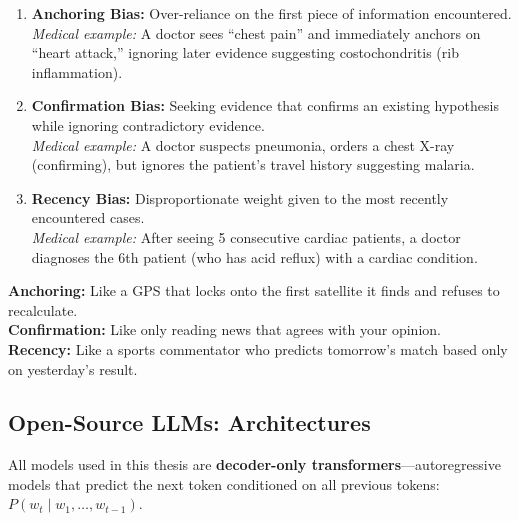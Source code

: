 \begin{enumerate}[label=\textbf{\arabic*.}]
    \item \textbf{Anchoring Bias:} Over-reliance on the first piece of information encountered.\\
    \textit{Medical example:} A doctor sees ``chest pain'' and immediately anchors on ``heart attack,'' ignoring later evidence suggesting costochondritis (rib inflammation).
    
    \item \textbf{Confirmation Bias:} Seeking evidence that confirms an existing hypothesis while ignoring contradictory evidence.\\
    \textit{Medical example:} A doctor suspects pneumonia, orders a chest X-ray (confirming), but ignores the patient's travel history suggesting malaria.
    
    \item \textbf{Recency Bias:} Disproportionate weight given to the most recently encountered cases.\\
    \textit{Medical example:} After seeing 5 consecutive cardiac patients, a doctor diagnoses the 6th patient (who has acid reflux) with a cardiac condition.
\end{enumerate}

\begin{analogybox}[\textcolor{white}{Simple Analogy}]
\textbf{Anchoring:} Like a GPS that locks onto the first satellite it finds and refuses to recalculate.\\
\textbf{Confirmation:} Like only reading news that agrees with your opinion.\\
\textbf{Recency:} Like a sports commentator who predicts tomorrow's match based only on yesterday's result.
\end{analogybox}

\subsection{Open-Source LLMs: Architectures}

\begin{acadbox}[\textcolor{white}{Academic Definition}]
All models used in this thesis are \textbf{decoder-only transformers}---autoregressive models that predict the next token conditioned on all previous tokens: $P(w_t \mid w_1, \ldots, w_{t-1})$.
\end{acadbox}


